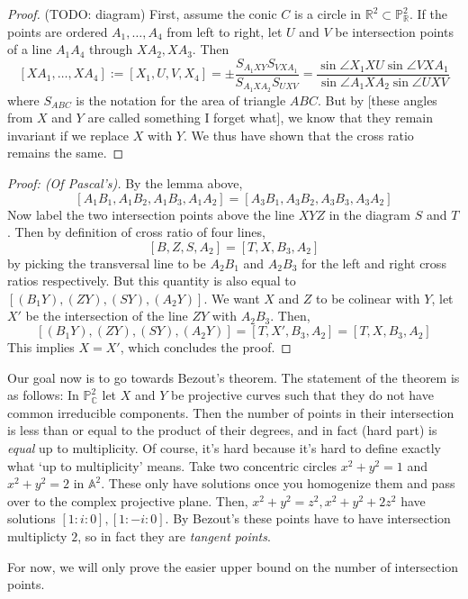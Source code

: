 \documentclass[12pt]{article}
\newcommand{\C}{\mathbb{C}}
\newcommand{\R}{\mathbb{R}}
\renewcommand{\P}{\mathbb{P}}
\newcommand{\A}{\mathbb{A}}
\begin{document}
    \begin{proof}
        (TODO: diagram) First, assume the conic $C$ is a circle in $\R^2 \subset \P_\R^2$. If the points are ordered $A_1, \dots, A_4$ from left to right, let $U$ and $V$ be intersection points of a line $A_1A_4$ through $XA_2, XA_3$. Then
        $$[XA_1, \dots, XA_4] := [X_1, U, V, X_4] = \pm \frac{S_{A_1XY} S_{VXA_1}}{S_{A_1XA_2}S_{UXV}} = \frac{\sin \angle X_1XU \sin \angle VXA_1}{\sin \angle A_1XA_2 \sin \angle UXV}$$
        where $S_{ABC}$ is the notation for the area of triangle $ABC$. But by [these angles from $X$ and $Y$ are called something I forget what], we know that they remain invariant if we replace $X$ with $Y$. We thus have shown that the cross ratio remains the same. 
    \end{proof}
    \begin{proof}
        [Proof: (Of Pascal's)] By the lemma above, 
        $$[A_1B_1, A_1B_2, A_1B_3, A_1A_2] = [A_3B_1, A_3B_2, A_3B_3, A_3A_2]$$
        Now label the two intersection points above the line $XYZ$ in the diagram $S$ and $T$. Then by definition of cross ratio of four lines, 
        $$[B, Z, S, A_2] = [T, X, B_3, A_2]$$
        by picking the transversal line to be $A_2B_1$ and $A_2B_3$ for the left and right cross ratios respectively. But this quantity is also equal to $[(B_1Y), (ZY), (SY), (A_2Y)]$. We want $X$ and $Z$ to be colinear with $Y$, let $X'$ be the intersection of the line $ZY$ with $A_2B_3$. Then, 
        $$[(B_1Y), (ZY), (SY), (A_2Y)] = [T, X', B_3, A_2] = [T, X, B_3, A_2]$$
        This implies $X = X'$, which concludes the proof. 
    \end{proof}
    Our goal now is to go towards Bezout's theorem. The statement of the theorem is as follows: In $\P_\C^2$ let $X$ and $Y$ be projective curves such that they do not have common irreducible components. Then the number of points in their intersection is less than or equal to the product of their degrees, and in fact (hard part) is \textit{equal} up to multiplicity. Of course, it's hard because it's hard to define exactly what `up to multiplicity' means. Take two concentric circles $x^2 + y^2 = 1$ and $x^2 + y^2 = 2$ in $\A^2$. These only have solutions once you homogenize them and pass over to the complex projective plane. Then, $x^2 + y^2 = z^2, x^2 + y^2 + 2z^2$ have solutions $[1:i:0], [1:-i:0]$. By Bezout's these points have to have intersection multiplicty $2$, so in fact they are \textit{tangent points}. \par 
    For now, we will only prove the easier upper bound on the number of intersection points. 
\end{document}
